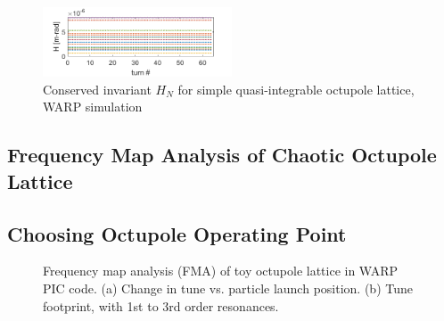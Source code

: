 \begin{figure}[]
   \centering
    \includegraphics[width=0.5\textwidth]{5.figures/HvsZ_crun1_toylattice.png}
 	\caption{Conserved invariant $H_N$ for simple quasi-integrable octupole lattice, WARP simulation}
   \label{toyinvar}
\end{figure}



\subsection{Frequency Map Analysis of Chaotic Octupole Lattice}


\subsection{Choosing Octupole Operating Point}

\begin{figure}[]
\centering
{}
\hspace{.5in}
\caption{Frequency map analysis (FMA) of toy octupole lattice in WARP PIC code. (a) Change in tune vs. particle launch position. (b) Tune footprint, with 1st to 3rd order resonances.}
\label{fig:toy-fma}
\end{figure}


